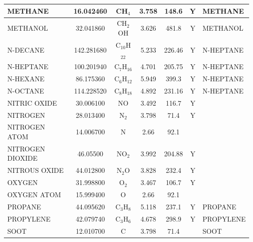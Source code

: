 \documentclass[11pt]{book}
\begin{document}
\begin{longtable}{@{\extracolsep{\fill}}|l|c|c|c|c|c|l|}
{\ct METHANE}            & 16.042460  & CH$_4$           & 3.758    & 148.6    &  Y       &  {\ct METHANE}             \\ \hline
{\ct METHANOL}           & 32.041860  & CH$_2$OH         & 3.626    & 481.8    &  Y       &  {\ct METHANOL}            \\ \hline
{\ct N-DECANE}           & 142.281680 & C$_{10}$H$_{22}$ & 5.233    & 226.46   &  Y       &  {\ct N-HEPTANE}           \\ \hline
{\ct N-HEPTANE}          & 100.201940 & C$_7$H$_{16}$    & 4.701    & 205.75   &  Y       &  {\ct N-HEPTANE}           \\ \hline
{\ct N-HEXANE}           & 86.175360  & C$_6$H$_{12}$    & 5.949    & 399.3    &  Y       &  {\ct N-HEPTANE}           \\ \hline
{\ct N-OCTANE}           & 114.228520 & C$_8$H$_{18}$    & 4.892    & 231.16   &  Y       &  {\ct N-HEPTANE}           \\ \hline
{\ct NITRIC OXIDE}       & 30.006100  & NO               & 3.492    & 116.7    &  Y       &                            \\ \hline
{\ct NITROGEN}           & 28.013400  & N$_2$            & 3.798    & 71.4     &  Y       &                            \\ \hline
{\ct NITROGEN ATOM}      & 14.006700  & N                & 2.66     & 92.1     &          &                            \\ \hline
{\ct NITROGEN DIOXIDE}   & 46.05500   & NO$_2$           & 3.992    & 204.88   &  Y       &                            \\ \hline
{\ct NITROUS OXIDE}      & 44.012800  & N$_2$O           & 3.828    & 232.4    &  Y       &                            \\ \hline
{\ct OXYGEN}             & 31.998800  & O$_2$            & 3.467    & 106.7    &  Y       &                            \\ \hline
{\ct OXYGEN ATOM}        & 15.999400  & O                & 2.66     & 92.1     &          &                            \\ \hline
{\ct PROPANE}            & 44.095620  & C$_3$H$_8$       & 5.118    & 237.1    &  Y       &  {\ct PROPANE}             \\ \hline
{\ct PROPYLENE}          & 42.079740  & C$_3$H$_6$       & 4.678    & 298.9    &  Y       &  {\ct PROPYLENE}           \\ \hline
{\ct SOOT}               & 12.010700  & C                & 3.798    & 71.4     &          &  {\ct SOOT}                \\ \hline

\end{longtable}
\end{document}
